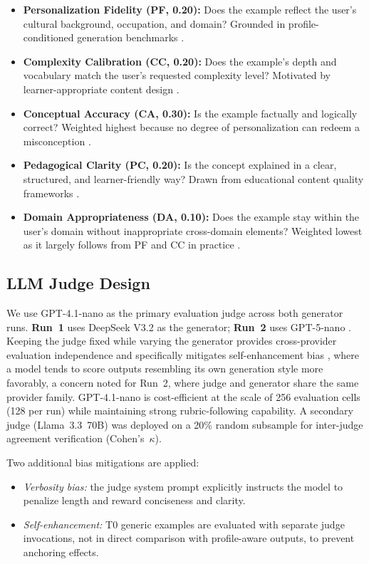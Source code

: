 \documentclass[conference]{IEEEtran}
\begin{document}
\begin{itemize}
    \item \textbf{Personalization Fidelity (PF, 0.20):} Does the example reflect the user's cultural background, occupation, and domain? Grounded in profile-conditioned generation benchmarks \cite{b3, b8}.
    \item \textbf{Complexity Calibration (CC, 0.20):} Does the example's depth and vocabulary match the user's requested complexity level? Motivated by learner-appropriate content design \cite{b13}.
    \item \textbf{Conceptual Accuracy (CA, 0.30):} Is the example factually and logically correct? Weighted highest because no degree of personalization can redeem a misconception \cite{b14}.
    \item \textbf{Pedagogical Clarity (PC, 0.20):} Is the concept explained in a clear, structured, and learner-friendly way? Drawn from educational content quality frameworks \cite{b4, b13}.
    \item \textbf{Domain Appropriateness (DA, 0.10):} Does the example stay within the user's domain without inappropriate cross-domain elements? Weighted lowest as it largely follows from PF and CC in practice \cite{b13}.
\end{itemize}


\subsection{LLM Judge Design}

We use GPT-4.1-nano as the primary evaluation judge across both generator runs. \textbf{Run~1} uses DeepSeek V3.2 \cite{b15} as the generator; \textbf{Run~2} uses GPT-5-nano \cite{b16}. Keeping the judge fixed while varying the generator provides cross-provider evaluation independence and specifically mitigates self-enhancement bias \cite{b11}, where a model tends to score outputs resembling its own generation style more favorably, a concern noted for Run~2, where judge and generator share the same provider family. GPT-4.1-nano is cost-efficient at the scale of 256 evaluation cells (128 per run) while maintaining strong rubric-following capability. A secondary judge (Llama~3.3~70B) was deployed on a 20\% random subsample for inter-judge agreement verification (Cohen's~$\kappa$).

Two additional bias mitigations are applied:
\begin{itemize}

    \item \textit{Verbosity bias:} the judge system prompt explicitly instructs the model to penalize length and reward conciseness and clarity.
    \item \textit{Self-enhancement:} T0 generic examples are evaluated with separate judge invocations, not in direct comparison with profile-aware outputs, to prevent anchoring effects.
\end{itemize}
\end{document}
